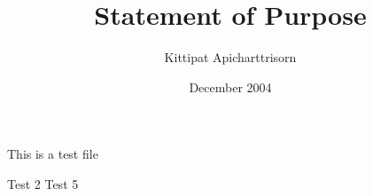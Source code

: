 \documentclass[14pt,a4paper]{article}
\begin{document}
\title{Statement of Purpose}
\author{Kittipat Apicharttrisorn}
\date{December 2004}
\maketitle
This is a test file

Test 2
 Test 5
\end{document}
